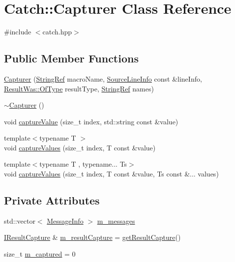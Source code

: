 \hypertarget{class_catch_1_1_capturer}{}\section{Catch\+::Capturer Class Reference}
\label{class_catch_1_1_capturer}


{\ttfamily \#include $<$catch.\+hpp$>$}

\subsection*{Public Member Functions}
\begin{DoxyCompactItemize}
\item 
\mbox{\hyperlink{class_catch_1_1_capturer_a86b0b27acc803a4e1310c10820f3038f}{Capturer}} (\mbox{\hyperlink{class_catch_1_1_string_ref}{String\+Ref}} macro\+Name, \mbox{\hyperlink{struct_catch_1_1_source_line_info}{Source\+Line\+Info}} const \&line\+Info, \mbox{\hyperlink{struct_catch_1_1_result_was_a624e1ee3661fcf6094ceef1f654601ef}{Result\+Was\+::\+Of\+Type}} result\+Type, \mbox{\hyperlink{class_catch_1_1_string_ref}{String\+Ref}} names)
\item 
\mbox{\hyperlink{class_catch_1_1_capturer_aecde85cf69e65565cec91e325a657b82}{$\sim$\+Capturer}} ()
\item 
void \mbox{\hyperlink{class_catch_1_1_capturer_a0695ebf77f7cdcb344c73bcb3d9131e4}{capture\+Value}} (size\+\_\+t index, std\+::string const \&value)
\item 
{\footnotesize template$<$typename T $>$ }\\void \mbox{\hyperlink{class_catch_1_1_capturer_a60d08e6db2e54740bb2298bbbec3bc0b}{capture\+Values}} (size\+\_\+t index, T const \&value)
\item 
{\footnotesize template$<$typename T , typename... Ts$>$ }\\void \mbox{\hyperlink{class_catch_1_1_capturer_a76f2a097cfeb3042688300b81eb9bcbc}{capture\+Values}} (size\+\_\+t index, T const \&value, Ts const \&... values)
\end{DoxyCompactItemize}
\subsection*{Private Attributes}
\begin{DoxyCompactItemize}
\item 
std\+::vector$<$ \mbox{\hyperlink{struct_catch_1_1_message_info}{Message\+Info}} $>$ \mbox{\hyperlink{class_catch_1_1_capturer_aefa14693d28906e5e7b06975af38aaed}{m\+\_\+messages}}
\item 
\mbox{\hyperlink{struct_catch_1_1_i_result_capture}{I\+Result\+Capture}} \& \mbox{\hyperlink{class_catch_1_1_capturer_a29edecce81d56837945ba2585c0ff941}{m\+\_\+result\+Capture}} = \mbox{\hyperlink{namespace_catch_aff60c1de6ac6cea30175d70e33d83c8e}{get\+Result\+Capture}}()
\item 
size\+\_\+t \mbox{\hyperlink{class_catch_1_1_capturer_a1c3bea0fde97a7663ece4b81187fa9ed}{m\+\_\+captured}} = 0
\end{DoxyCompactItemize}


